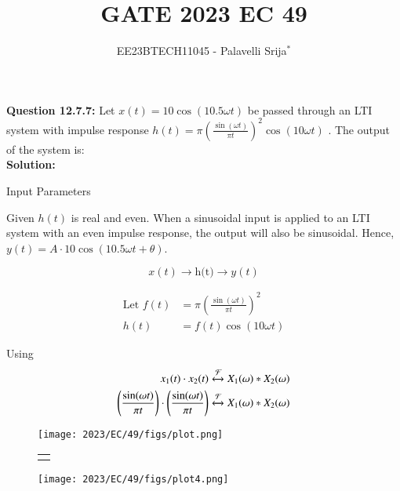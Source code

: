 \documentclass[journal,12pt,twocolumn]{IEEEtran}
\begin{document}
\title{GATE 2023 EC 49}
\author{EE23BTECH11045 - Palavelli Srija$^{*}$}
\maketitle

\bigskip

\textbf{Question 12.7.7:} 
Let $x(t) = 10 \cos(10.5 \omega t)$ be passed through an LTI system with impulse response $h(t) = \pi\left(\frac{\sin(\omega t)}{\pi t}\right)^2 \cos(10 \omega t)$ . The output of the system is: \\

\textbf{Solution:}
\fi
\begin{table}[h!]
    \centering
    
    \caption{Input Parameters}
    \label{tab:table_sr10}
\end{table}

Given \(h(t)\) is real and even. When a sinusoidal input is applied to an LTI system with an even impulse response, the output will also be sinusoidal. Hence, \(y(t) = A\cdot 10\cos(10.5 \omega t + \theta)\).

\[
x(t) \xrightarrow{\text{}} \boxed{\text{h(t)}} \xrightarrow{\text{}} y(t)
\]

\begin{align}
\text{Let } f(t) &= \pi\left(\frac{\sin(\omega t)}{\pi t}\right)^2 \\
h(t) &= f(t) \cos(10 \omega t)
\end{align}

Using 
\begin{align}
x_1(t) \cdot x_2(t) \xleftrightarrow{\mathcal{F}} X_1(\omega) * X_2(\omega)\\
\left(\frac{\sin(\omega t)}{\pi t}\right) \cdot \left(\frac{\sin(\omega t)}{\pi t}\right) \xleftrightarrow{\mathcal{F}} X_1(\omega) * X_2(\omega)
\end{align}
\begin{figure}[h!]
    \centering
    \texttt{[image: 2023/EC/49/figs/plot.png]}\hfill
    \begin{tabular}{c}
        {\sffamily\raisebox{1.75cm}{*}} 
    \end{tabular}\hfill
    \texttt{[image: 2023/EC/49/figs/plot4.png]}
    
    \caption{}
    \label{fig:overall}
\end{figure}
\end{document}

